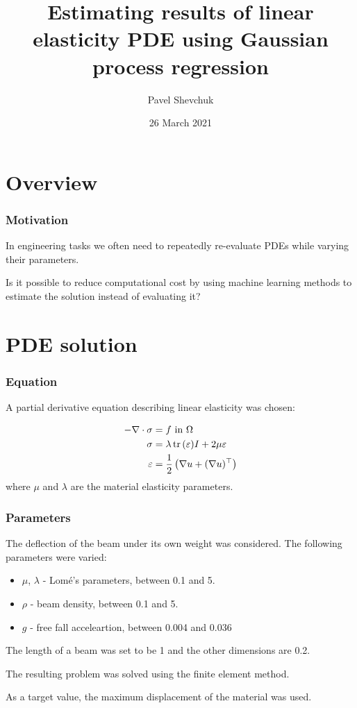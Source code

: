 \documentclass{beamer}
\title{Estimating results of linear elasticity PDE using Gaussian process regression}
\author{Pavel Shevchuk}
\date{26 March 2021}
\begin{document}
\frame{\titlepage}

\section {Overview}
\frame
{
  \frametitle{Motivation}
  In engineering tasks we often need to repeatedly re-evaluate PDEs while varying their parameters.
  
  Is it possible to reduce computational cost by using machine learning methods to estimate the solution instead of evaluating it?
}

\section{PDE solution}
\frame
{
 \frametitle{Equation}
  A partial derivative equation describing linear elasticity was chosen: 
  
  
\begin{align*}
-\nabla\cdot\sigma &= f\hbox{ in }\Omega\\ 
\sigma &= \lambda\,\hbox{tr}\,(\varepsilon) I + 2\mu\varepsilon\\ 
\varepsilon &= \frac{1}{2}\left(\nabla u + (\nabla u)^{\top}\right)
\end{align*}
where $\mu$ and $\lambda$ are the material elasticity parameters.
}

\frame
{
 \frametitle{Parameters}
  The deflection of the beam under its own weight was considered.  The following parameters were varied:
  \begin{itemize}
  \item $\mu$, $\lambda$ - Lomé's parameters, between 0.1 and 5.
  \item $\rho$ - beam density, between 0.1 and 5.
  \item $g$ - free fall acceleartion, between 0.004 and 0.036
  \end{itemize}
  
  The length of a beam was set to be 1 and the other dimensions are 0.2.
  
  The resulting problem was solved using the finite element method.
  
  As a target value, the maximum displacement of the material was used.
}
\end{document}
